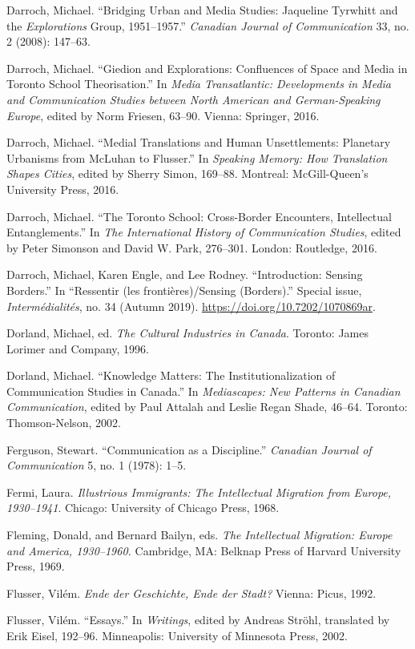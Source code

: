 \documentclass{tufte-handout}
\begin{document}
\begin{hangparas}{.25in}{1}
Darroch, Michael. ``Bridging Urban and Media Studies: Jaqueline Tyrwhitt
and the \emph{Explorations} Group, 1951--1957.'' \emph{Canadian Journal
of Communication} 33, no. 2 (2008): 147--63.

Darroch, Michael. ``Giedion and Explorations: Confluences of Space and
Media in Toronto School Theorisation.'' In \emph{Media Transatlantic:
Developments in Media and Communication Studies between North American
and German-Speaking Europe}, edited by Norm Friesen, 63--90. Vienna:
Springer, 2016.

Darroch, Michael. ``Medial Translations and Human Unsettlements:
Planetary Urbanisms from McLuhan to Flusser.'' In \emph{Speaking Memory:
How Translation Shapes Cities}, edited by Sherry Simon, 169--88.
Montreal: McGill-Queen's University Press, 2016.

Darroch, Michael. ``The Toronto School: Cross-Border Encounters,
Intellectual Entanglements.'' In \emph{The International History of
Communication Studies}, edited by Peter Simonson and David W. Park,
276--301. London: Routledge, 2016.

Darroch, Michael, Karen Engle, and Lee Rodney. ``Introduction: Sensing
Borders.'' In ``Ressentir (les frontières)/Sensing (Borders).'' Special
issue, \emph{Intermédialités}, no. 34 (Autumn 2019).
\url{https://doi.org/10.7202/1070869ar}.

Dorland, Michael, ed. \emph{The Cultural Industries in Canada}. Toronto:
James Lorimer and Company, 1996.

Dorland, Michael. ``Knowledge Matters: The Institutionalization of
Communication Studies in Canada.'' In \emph{Mediascapes: New Patterns in
Canadian Communication}, edited by Paul Attalah and Leslie Regan Shade,
46--64. Toronto: Thomson-Nelson, 2002.

Ferguson, Stewart. ``Communication as a Discipline.'' \emph{Canadian
Journal of Communication} 5, no. 1 (1978): 1--5.

Fermi, Laura. \emph{Illustrious Immigrants: The Intellectual Migration
from Europe, 1930--1941}. Chicago: University of Chicago Press, 1968.

Fleming, Donald, and Bernard Bailyn, eds. \emph{The Intellectual
Migration: Europe and America, 1930--1960.} Cambridge, MA: Belknap Press
of Harvard University Press, 1969.

Flusser, Vilém. \emph{Ende der Geschichte, Ende der Stadt?} Vienna:
Picus, 1992.

Flusser, Vilém. ``Essays.'' In \emph{Writings}, edited by Andreas
Ströhl, translated by Erik Eisel, 192--96. Minneapolis: University of
Minnesota Press, 2002.


\end{hangparas}
\end{document}
